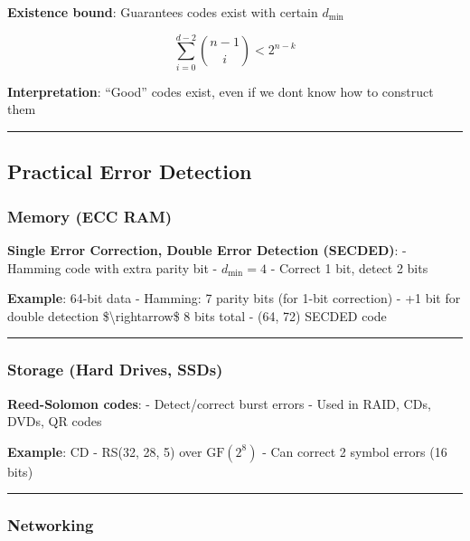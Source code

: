 \textbf{Existence bound}: Guarantees codes exist with certain
\(d_{\min}\)

\[
\sum_{i=0}^{d-2} \binom{n-1}{i} < 2^{n-k}
\]

\textbf{Interpretation}: ``Good'' codes exist, even if we
don\textquotesingle t know how to construct them

\begin{center}\rule{0.5\linewidth}{0.5pt}\end{center}

\subsection{Practical Error Detection}\label{practical-error-detection}

\subsubsection{Memory (ECC RAM)}\label{memory-ecc-ram}

\textbf{Single Error Correction, Double Error Detection (SECDED)}: -
Hamming code with extra parity bit - \(d_{\min} = 4\) - Correct 1 bit,
detect 2 bits

\textbf{Example}: 64-bit data - Hamming: 7 parity bits (for 1-bit
correction) - +1 bit for double detection \$\textbackslash rightarrow\$
8 bits total - (64, 72) SECDED code

\begin{center}\rule{0.5\linewidth}{0.5pt}\end{center}

\subsubsection{Storage (Hard Drives,
SSDs)}\label{storage-hard-drives-ssds}

\textbf{Reed-Solomon codes}: - Detect/correct burst errors - Used in
RAID, CDs, DVDs, QR codes

\textbf{Example}: CD - RS(32, 28, 5) over \(\mathrm{GF}(2^8)\) - Can
correct 2 symbol errors (16 bits)

\begin{center}\rule{0.5\linewidth}{0.5pt}\end{center}

\subsubsection{Networking}\label{networking}

